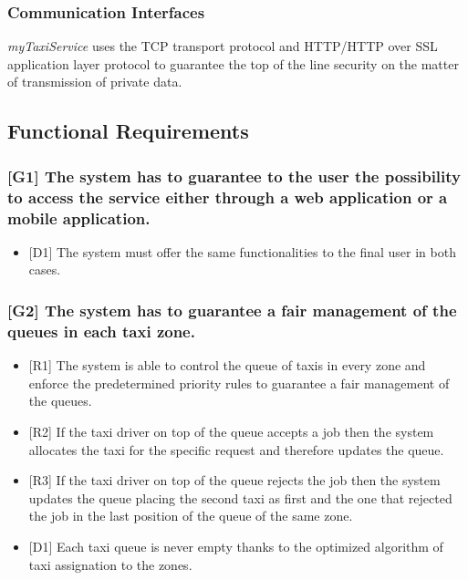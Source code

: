 \documentclass[a4paper,11pt]{report} %
\newcommand{\mts}{\mbox{\normalfont\itshape myTaxiService}}
\begin{document}
	
	\subsubsection{Communication Interfaces} \mts{} uses the TCP transport protocol and HTTP/HTTP over SSL application layer protocol to guarantee the top of the line security on the matter of transmission of private data.
	
	\subsection{Functional Requirements}
	
	\subsubsection{{[}G1{]} The system has to guarantee to the user the possibility to access the service either through a web application or a mobile application.}
	\begin{itemize}
		\item {[}D1{]} The system must offer the same functionalities to the final user in both cases.
	\end{itemize}
	
	\subsubsection{{[}G2{]} The system has to guarantee a fair management of the queues in each taxi zone.}
	\begin{itemize}
		\item {[}R1{]} The system is able to control the queue of taxis in every zone and enforce the predetermined priority rules to guarantee a fair management of the queues.
		\item {[}R2{]} If the taxi driver on top of the queue accepts a job then the system allocates the taxi for the specific request and therefore updates the queue.
		\item {[}R3{]} If the taxi driver on top of the queue rejects the job then the system updates the queue placing the second taxi as first and the one that rejected the job in the last position of the queue of the same zone.
		\item {[}D1{]} Each taxi queue is never empty thanks to the optimized algorithm of taxi assignation to the zones.
	\end{itemize}
		
\end{document}
